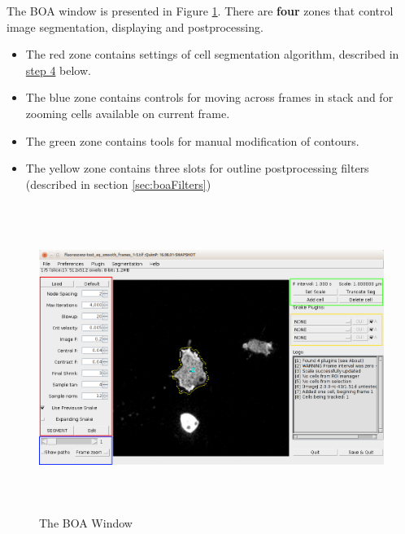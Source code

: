 \documentclass[a4paper,12pt]{article}
\begin{document}
The BOA window is presented in Figure \ref{boaWindow}. There are \textbf{four} zones that control image segmentation, displaying and postprocessing. 
\begin{itemize}
	\item The red zone contains settings of cell segmentation algorithm, described in \hyperref[step4]{step 4} below. 
	\item The blue zone contains controls for moving across frames in stack and for zooming cells available on current frame.
	\item The green zone contains tools for manual modification of contours.
	\item The yellow zone contains three slots for outline postprocessing filters (described in section \ref{sec:boaFilters})
\end{itemize}

\begin{figure}[ht]
	\centering
	\includegraphics[height=10cm]{boaWindow.png}
	\caption{The BOA Window}
	\label{boaWindow}
\end{figure}
\end{document}

